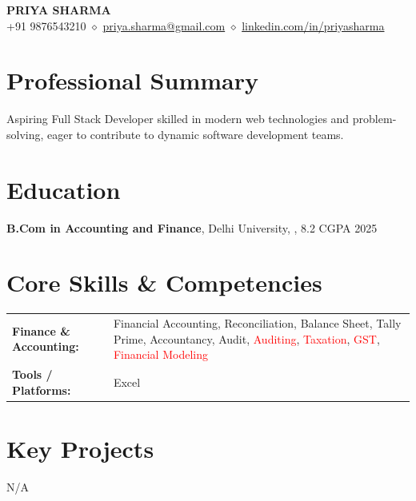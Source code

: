 \documentclass[10pt,a4paper]{article}
\begin{document}
\begin{center}
{\LARGE \textsc{\textbf{PRIYA SHARMA}}} \\ \vspace{3pt}
+91 9876543210 $\diamond$ \href{mailto:priya.sharma@gmail.com}{priya.sharma@gmail.com} $\diamond$ \href{https://linkedin.com/in/priyasharma}{linkedin.com/in/priyasharma}
\end{center}

\section*{Professional Summary}
Aspiring Full Stack Developer skilled in modern web technologies and problem-solving, eager to contribute to dynamic software development teams.

\section*{Education}
\noindent \textbf{B.Com in Accounting and Finance}, Delhi University, , 8.2 CGPA \hfill 2025 \\ \vspace{4pt}


\section*{Core Skills \& Competencies}
\begin{tabular}{@{}p{2.3in}p{4.5in}@{}}
\textbf{Finance \& Accounting:} & Financial Accounting, Reconciliation, Balance Sheet, Tally Prime, Accountancy, Audit, \textcolor{red}{Auditing}, \textcolor{red}{Taxation}, \textcolor{red}{GST}, \textcolor{red}{Financial Modeling} \\
\textbf{Tools / Platforms:} & Excel \\
\end{tabular}



\section*{Key Projects}
N/A


\end{document}
